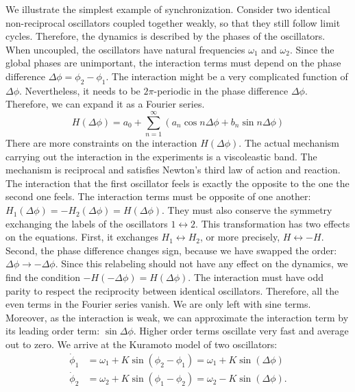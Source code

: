 \documentclass[11pt, a4paper]{article} %
\begin{document}
We illustrate the simplest example of synchronization. Consider two identical non-reciprocal oscillators coupled together weakly, 
so that they still follow limit cycles. Therefore, the dynamics is described by the phases of the oscillators. 
When uncoupled, the oscillators have natural frequencies $\omega_1$ and $\omega_2$. 
Since the global phases are unimportant, the interaction terms must depend on the phase difference $\Delta\phi = \phi_2 - \phi_1$. 
The interaction might be a very complicated function of $\Delta\phi$. 
Nevertheless, it needs to be $2\pi$-periodic in the phase difference $\Delta\phi$. Therefore, we can expand it as a Fourier series. 
\begin{equation}
    H(\Delta\phi) = a_0 + \sum_{n=1}^\infty \left(a_n\cos{n\Delta\phi} + b_n\sin{n\Delta\phi}\right)
\end{equation}
There are more constraints on the interaction $H(\Delta\phi)$. The actual mechanism carrying out the interaction 
in the experiments is a viscoleastic band. The mechanism is reciprocal and satisfies Newton's third law of action and reaction. 
The interaction that the first oscillator feels is exactly the opposite to the one the second one feels. 
The interaction terms must be opposite of one another: $H_1(\Delta\phi) = -H_2(\Delta\phi) = H(\Delta\phi)$. 
They must also conserve the symmetry exchanging the labels of the oscillators $1\leftrightarrow2$. 
This transformation has two effects on the equations. First, it exchanges $H_1\leftrightarrow H_2$, or more precisely, 
$H\leftrightarrow -H$. Second, the phase difference changes sign, because we have swapped the order: $\Delta\phi\rightarrow-\Delta\phi$.
Since this relabeling should not have any effect on the dynamics, we find the condition $-H(-\Delta\phi)=H(\Delta\phi)$. 
The interaction must have odd parity to respect the reciprocity between identical oscillators. 
Therefore, all the even terms in the Fourier series vanish. We are only left with sine terms. 
Moreover, as the interaction is weak, we can approximate the interaction term by its leading order term: $\sin{\Delta\phi}$. 
Higher order terms oscillate very fast and average out to zero. 
We arrive at the Kuramoto model \cite{kuramoto} of two oscillators:
\begin{align}
    \dot{\phi}_1 &= \omega_1 + K \sin(\phi_2 - \phi_1) = \omega_1 + K \sin(\Delta\phi) \label{eq:Kuramoto_1}\\
    \dot{\phi}_2 &= \omega_2 + K \sin(\phi_1 - \phi_2) = \omega_2 - K \sin(\Delta\phi) \label{eq:Kuramoto_2}.
\end{align}
\end{document}
